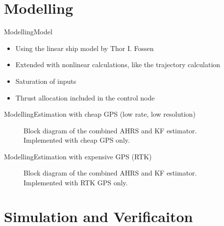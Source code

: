 \documentclass[10pt,handout]{beamer}
\begin{document}
\section{Modelling}
\begin{frame}{Modelling}{Model}
  \begin{itemize}
    \item Using the linear ship model by Thor I. Fossen
    \item Extended with nonlinear calculations, like the trajectory calculation
    \item Saturation of inputs
    \item Thrust allocation included in the control node
  \end{itemize}
\end{frame}

\begin{frame}{Modelling}{Estimation with cheap GPS (low rate, low	resolution)}
  \begin{figure}
    {\tiny }
	  \caption{\scriptsize Block diagram of the combined AHRS and KF
		estimator. Implemented with cheap GPS only.}
  \end{figure}
\end{frame}

\begin{frame}{Modelling}{Estimation with expensive GPS (RTK)}
  \begin{figure}
    {\tiny }
    \caption{\scriptsize Block diagram of the combined AHRS and KF
		estimator. Implemented with RTK GPS only.}
  \end{figure}
\end{frame}

\section{Simulation and Verificaiton}
\end{document}
